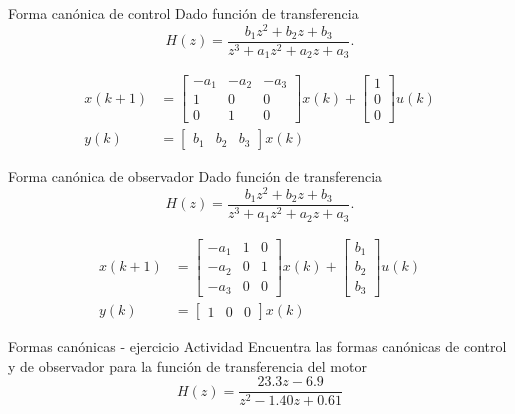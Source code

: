 \documentclass[presentation,aspectratio=1610]{beamer}
\begin{document}
\begin{frame}[label={sec:orgaf260e0}]{Forma canónica de control}
Dado función de transferencia 
\[ H(z) = \frac{b_1 z^2 + b_2 z + b_3}{z^3 + a_1z^2 + a_2z + a_3}.\] 

\begin{align*}
 x(k+1) &= \begin{bmatrix} -a_1 & -a_2 & -a_3\\1 & 0 & 0\\0 & 1 & 0\end{bmatrix} x(k) + \begin{bmatrix}1\\0\\0\end{bmatrix} u(k) \\
 y(k) &= \begin{bmatrix} b_1 & b_2 & b_3 \end{bmatrix} x(k)
 \end{align*}
\end{frame}


\begin{frame}[label={sec:org21996c0}]{Forma canónica de observador}
Dado función de transferencia 
\[ H(z) = \frac{b_1 z^2 + b_2 z + b_3}{z^3 + a_1z^2 + a_2z + a_3}.\] 

\begin{align*}
 x(k+1) &= \begin{bmatrix} -a_1 & 1 & 0\\-a_2 & 0 & 1\\-a_3 & 0 & 0\end{bmatrix} x(k) + \begin{bmatrix}b_1\\b_2\\b_3\end{bmatrix} u(k) \\
 y(k) &= \begin{bmatrix} 1 & 0 & 0 \end{bmatrix} x(k)
 \end{align*}
\end{frame}


\begin{frame}[label={sec:org3ea89d0}]{Formas canónicas - ejercicio}
\alert{Actividad} Encuentra las formas canónicas de control y de observador para la función de transferencia del motor
\[H(z) = \frac{23.3z - 6.9}{z^2 - 1.40z + 0.61}\]
\end{frame}
\end{document}
